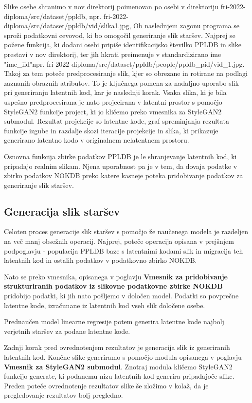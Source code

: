 \documentclass[a4paper,12pt,openright]{book}
\begin{document}
Slike osebe shranimo v nov direktorij poimenovan po osebi v direktoriju 
fri-2022-diploma/src/dataset/ppldb, npr. \break
fri-2022-diploma/src/dataset/ppldb/vid/slika1.jpg,
Ob naslednjem zagonu programa se sproži podatkovni cevovod, ki bo omogočil generiranje slik staršev. Najprej se požene funkcija, ki dodani osebi pripiše identifikacijsko številko PPLDB in slike prestavi v nov direktorij, ter jih hkrati preimenuje v standardizirano ime "ime\_iid"npr. \break
fri-2022-diploma/src/dataset/ppldb/people/ppldb\_pid/vid\_1.jpg. 
Takoj za tem poteče predprocesiranje slik, kjer so obrezane in rotirane na podlagi zaznanih obraznih atributov. To je ključnega pomena za nadaljno uporabo slik pri generiranju latentnih kod, kar je naslednji korak. Vsaka slika, ki je bila uspešno predprocesirana je nato projecirana v latentni prostor s pomočjo StyleGAN2 funkcije project, ki jo kličemo preko vmesnika za StyleGAN2 submodul. Rezultat projekcije so latentne kode, graf spreminjanja rezultata funkcije izgube in razdalje skozi iteracije projekcije in slika, ki prikazuje generirano latentno kodo v originalnem nelatentnem prostoru.

Osnovna funkcija zbirke podatkov PPLDB je le shranjevanje latentnih kod, ki pripadajo realnim slikam. Njena uporabnost pa je v tem, da dovaja podatke v zbirko podatkov NOKDB preko katere kasneje poteka pridobivanje podatkov za generiranje slik staršev.

\subsection{Generacija slik staršev}
Celoten proces generacije slik staršev s pomočjo že naučenega modela je razdeljen na več manj obsežnih operacij. Najprej, poteče operacija opisana v prejšnjem podpoglavju - populacija PPLDB baze s latentnimi kodami slik in migracija teh latentnih kod in ostalih podatkov v podatkovno zbirko NOKDB. 

Nato se preko vmesnika, opisanega v poglavju \textbf{Vmesnik za pridobivanje strukturiranih podatkov iz slikovne podatkovne zbirke NOKDB} pridobijo podatki, ki jih nato pošljemo v določen model. Podatki so povprečne latentne kode, izračunane iz latentnih kod vseh slik določene osebe.

Prednaučen model linearne regresije potem generira latentne kode najbolj verjetnih staršev za podane latentne kode. 

Zadnji korak pred ovrednotenjem rezultatov je generacija slik iz generiranih latentnih kod. Končne slike generiramo s pomočjo modula opisanega v poglavju \textbf{Vmesnik za StyleGAN2 submodul}. Znotraj modula kličemo StyleGAN2 funkcijo generate, ki podanemu nizu latentnih kod generira pripadajoče slike. Preden poteče ovrednotenje rezultatov slike še zložimo v kolaž, da je pregledovanje rezultatov bolj pregledno.
\end{document}
